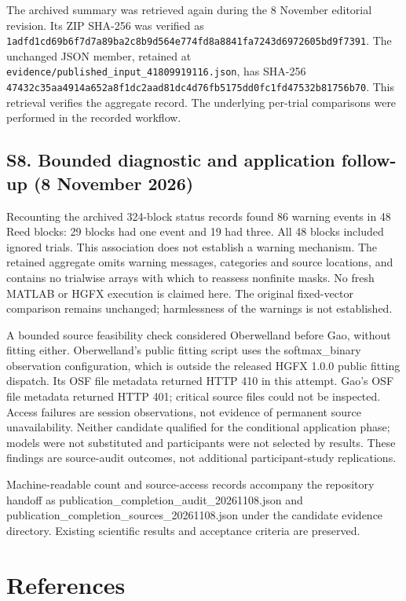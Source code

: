 \documentclass[
  11pt,
]{article}
\begin{document}
The archived summary was retrieved again during the 8 November editorial
revision. Its ZIP SHA-256 was verified as
\texttt{1adfd1cd69b6f7d7a89ba2c8b9d564e774fd8a8841fa7243d6972605bd9f7391}.
The unchanged JSON member, retained at
\texttt{evidence/published\_input\_41809919116.json}, has SHA-256
\texttt{47432c35aa4914a652a8f1dc2aad81dc4d76fb5175dd0fc1fd47532b81756b70}.
This retrieval verifies the aggregate record. The underlying per-trial
comparisons were performed in the recorded workflow.

\subsection{S8. Bounded diagnostic and application follow-up (8 November
2026)}\label{s8.-bounded-diagnostic-and-application-follow-up-8-november-2026}

Recounting the archived 324-block status records found 86 warning events
in 48 Reed blocks: 29 blocks had one event and 19 had three. All 48
blocks included ignored trials. This association does not establish a
warning mechanism. The retained aggregate omits warning messages,
categories and source locations, and contains no trialwise arrays with
which to reassess nonfinite masks. No fresh MATLAB or HGFX execution is
claimed here. The original fixed-vector comparison remains unchanged;
harmlessness of the warnings is not established.

A bounded source feasibility check considered Oberwelland before Gao,
without fitting either. Oberwelland's public fitting script uses the
softmax\_binary observation configuration, which is outside the released
HGFX 1.0.0 public fitting dispatch. Its OSF file metadata returned HTTP
410 in this attempt. Gao's OSF file metadata returned HTTP 401; critical
source files could not be inspected. Access failures are session
observations, not evidence of permanent source unavailability. Neither
candidate qualified for the conditional application phase; models were
not substituted and participants were not selected by results. These
findings are source-audit outcomes, not additional participant-study
replications.

Machine-readable count and source-access records accompany the
repository handoff as publication\_completion\_audit\_20261108.json and
publication\_completion\_sources\_20261108.json under the candidate
evidence directory. Existing scientific results and acceptance criteria
are preserved.

\section*{References}\label{bibliography}
\end{document}

